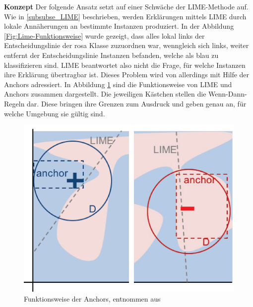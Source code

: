 \textbf{Konzept}
Der folgende Ansatz setzt auf einer Schwäche der LIME-Methode auf. Wie in \ref{subsubse_LIME} beschrieben, werden Erklärungen mittels LIME durch lokale Annäherungen an bestimmte Instanzen produziert. In der Abbildung \ref{Fig:Lime-Funktionsweise} wurde gezeigt, dass alles lokal links der Entscheidungslinie der rosa Klasse zuzuordnen war, wenngleich sich links, weiter entfernt der Entscheidungslinie Instanzen befanden, welche als blau zu klassifizieren sind. LIME beantwortet also nicht die Frage, für welche Instanzen ihre Erklärung übertragbar ist. Dieses Problem wird von \textcite{ribeiro2018anchors} allerdings mit Hilfe der Anchors adressiert.
In Abbildung \ref{Fig:Funktionsweise_Anchors} sind die Funktionsweise von LIME und Anchors zusammen dargestellt. Die jeweiligen Kästchen stellen die Wenn-Dann-Regeln dar. Diese bringen ihre Grenzen zum Ausdruck und geben genau an, für welche Umgebung sie gültig sind.
\begin{figure}
    \centering
    \includegraphics[scale=0.45]{pic/MA-Bilder/Literaturrecherche/Anchor.PNG}
    \caption{Funktionsweise der Anchors, entnommen aus \cite{ribeiro2018anchors}}
    \label{Fig:Funktionsweise_Anchors}
\end{figure}


